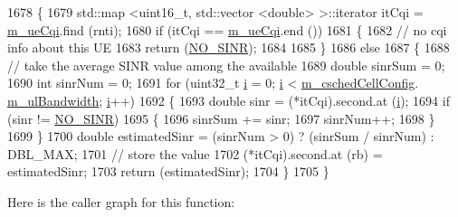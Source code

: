 \begin{DoxyCode}
1678 \{
1679   std::map <uint16\_t, std::vector <double> >::iterator itCqi = \hyperlink{classns3_1_1FdTbfqFfMacScheduler_a74c33465af3fd4306d994e9942836a27}{m\_ueCqi}.find (rnti);
1680   \textcolor{keywordflow}{if} (itCqi == \hyperlink{classns3_1_1FdTbfqFfMacScheduler_a74c33465af3fd4306d994e9942836a27}{m\_ueCqi}.end ())
1681     \{
1682       \textcolor{comment}{// no cqi info about this UE}
1683       \textcolor{keywordflow}{return} (\hyperlink{cqa-ff-mac-scheduler_8h_a520d71777be043568160c783a9c65fd5}{NO\_SINR});
1684 
1685     \}
1686   \textcolor{keywordflow}{else}
1687     \{
1688       \textcolor{comment}{// take the average SINR value among the available}
1689       \textcolor{keywordtype}{double} sinrSum = 0;
1690       \textcolor{keywordtype}{int} sinrNum = 0;
1691       \textcolor{keywordflow}{for} (uint32\_t \hyperlink{bernuolliDistribution_8m_a6f6ccfcf58b31cb6412107d9d5281426}{i} = 0; \hyperlink{bernuolliDistribution_8m_a6f6ccfcf58b31cb6412107d9d5281426}{i} < \hyperlink{classns3_1_1FdTbfqFfMacScheduler_a73d5d866713fa06e1cc6186b0f556693}{m\_cschedCellConfig}.
      \hyperlink{structns3_1_1FfMacCschedSapProvider_1_1CschedCellConfigReqParameters_a5ab5b102878e6e7e7727a14af4a64d2f}{m\_ulBandwidth}; \hyperlink{bernuolliDistribution_8m_a6f6ccfcf58b31cb6412107d9d5281426}{i}++)
1692         \{
1693           \textcolor{keywordtype}{double} sinr = (*itCqi).second.at (\hyperlink{bernuolliDistribution_8m_a6f6ccfcf58b31cb6412107d9d5281426}{i});
1694           \textcolor{keywordflow}{if} (sinr != \hyperlink{cqa-ff-mac-scheduler_8h_a520d71777be043568160c783a9c65fd5}{NO\_SINR})
1695             \{
1696               sinrSum += sinr;
1697               sinrNum++;
1698             \}
1699         \}
1700       \textcolor{keywordtype}{double} estimatedSinr = (sinrNum > 0) ? (sinrSum / sinrNum) : DBL\_MAX;
1701       \textcolor{comment}{// store the value}
1702       (*itCqi).second.at (rb) = estimatedSinr;
1703       \textcolor{keywordflow}{return} (estimatedSinr);
1704     \}
1705 \}
\end{DoxyCode}


Here is the caller graph for this function\+:


